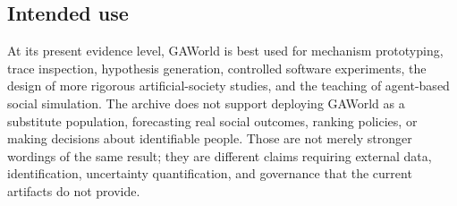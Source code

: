 \subsection{Intended use}

At its present evidence level, GAWorld is best used for mechanism
prototyping, trace inspection, hypothesis generation, controlled software
experiments, the design of more rigorous artificial-society studies, and
the teaching of agent-based social simulation.  The archive does not
support deploying GAWorld as a substitute population, forecasting real
social outcomes, ranking policies, or making decisions about
identifiable people.  Those are not merely stronger wordings of the
same result; they are different claims requiring external data,
identification, uncertainty quantification, and governance that the
current artifacts do not provide.
